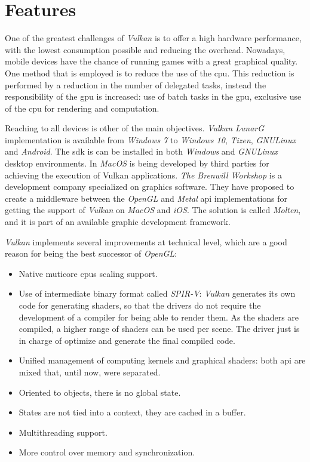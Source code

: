 \chapter{Features}\label{ch:features}
One of the greatest challenges of \emph{Vulkan} is to offer a high hardware performance, with the lowest consumption
possible and reducing the overhead. Nowadays, mobile devices have the chance of running games with a great graphical
quality. One method that is employed is to reduce the use of the \gls{cpu}. This reduction is performed by a reduction
in the number of delegated tasks, instead the responsibility of the \gls{gpu} is increased: use of batch tasks in the
\gls{gpu}, exclusive use of the \gls{cpu} for rendering and computation.

Reaching to all devices is other of the main objectives. \emph{Vulkan LunarG} implementation is available from
\emph{Windows 7} to \emph{Windows 10}, \emph{Tizen}, \emph{GNU\/Linux} and \emph{Android}. The \gls{sdk} is can be
installed in both \emph{Windows} and \emph{GNU\/Linux} desktop environments. In \emph{MacOS} is being developed by
third parties for achieving the execution of Vulkan applications. \emph{The Brenwill Workshop} is a development company
specialized on graphics software. They have proposed to create a middleware between the \emph{OpenGL} and \emph{Metal}
\gls{api} implementations for getting the support of \emph{Vulkan} on \emph{MacOS} and \emph{iOS}. The solution
is called \emph{Molten}, and it is part of an available graphic development framework.

\emph{Vulkan} implements several improvements at technical level, which are a good reason for being the best successor
of \emph{OpenGL}:
\begin{itemize}
    \item Native muticore \gls{cpu}s scaling support.
    \item Use of intermediate binary format called \emph{SPIR-V}: \emph{Vulkan} generates its own code for generating
    shaders, so that the drivers do not require the development of a compiler for being able to render them. As the
    shaders are compiled, a higher range of shaders can be used per scene. The driver just is in charge of optimize
    and generate the final compiled code.
    \item Unified management of computing kernels and graphical shaders: both \gls{api} are mixed that, until now, were
    separated.
    \item Oriented to objects, there is no global state.
    \item States are not tied into a context, they are cached in a buffer.
    \item Multithreading support.
    \item More control over memory and synchronization.
\end{itemize}

